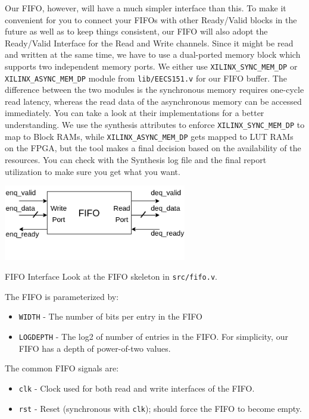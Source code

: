 \documentclass[11pt]{article}
\makeatletter
\renewcommand{\subsection}
{\@startsection {subsection}{1}{0pt}
 {-1ex}
 {0.5ex}
 {\bfseries\normalsize}}
\makeatother
\begin{document}
Our FIFO, however, will have a much simpler interface than this. To make it convenient for you to connect your FIFOs with other Ready/Valid blocks in the future as well as to keep things consistent, our FIFO will also adopt the Ready/Valid Interface for the Read and Write channels. Since it might be read and written at the same time, we have to use a dual-ported memory block which supports two independent memory ports. We either use \verb|XILINX_SYNC_MEM_DP| or \verb|XILINX_ASYNC_MEM_DP| module from \verb|lib/EECS151.v| for our FIFO buffer. The difference between the two modules is the synchronous memory requires one-cycle read latency, whereas the read data of the asynchronous memory can be accessed immediately. You can take a look at their implementations for a better understanding. We use the synthesis attributes to enforce \verb|XILINX_SYNC_MEM_DP| to map to Block RAMs, while \verb|XILINX_ASYNC_MEM_DP| gets mapped to LUT RAMs on the FPGA, but the tool makes a final decision based on the availability of the resources. You can check with the Synthesis log file and the final report utilization to make sure you get what you want.


\begin{center}
\includegraphics[width=0.6\textwidth]{figs/fifo.png}
\end{center}

\subsection{FIFO Interface}
Look at the FIFO skeleton in \verb|src/fifo.v|.

The FIFO is parameterized by:
\begin{itemize}
    \item \verb|WIDTH|    - The number of bits per entry in the FIFO
    \item \verb|LOGDEPTH| - The log2 of number of entries in the FIFO. For simplicity, our FIFO has a depth of power-of-two values.
\end{itemize}

The common FIFO signals are:
\begin{itemize}
    \item \verb|clk| - Clock used for both read and write interfaces of the FIFO.
    \item \verb|rst| - Reset (synchronous with \verb|clk|); should force the FIFO to become empty.
\end{itemize}
\end{document}
